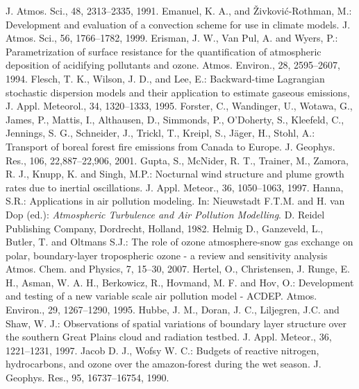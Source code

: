 \documentclass{egu}            %
\begin{document}
\begin{thebibliography}{}
J. Atmos. Sci., 48, 2313--2335, 1991.
Emanuel, K. A., and \v{Z}ivkovi\'{c}-Rothman, M.:
Development and evaluation of a convection scheme for use in climate models.
J. Atmos. Sci., 56, 1766--1782, 1999.
Erisman, J. W., Van Pul, A. and Wyers, P.:
Parametrization of surface resistance for the quantification of atmospheric deposition of acidifying pollutants and ozone.
Atmos. Environ., 28, 2595--2607, 1994.
Flesch, T. K., Wilson, J. D., and Lee, E.:
Backward-time Lagrangian stochastic dispersion models and their application to estimate gaseous emissions,
J. Appl. Meteorol., 34, 1320--1333, 1995.
Forster, C., Wandinger, U., Wotawa, G., James, P., Mattis, I., Althausen, D., Simmonds, P., O'Doherty, S., Kleefeld, C., Jennings, S. G., Schneider, J., Trickl, T., Kreipl, S., J\"ager, H., Stohl, A.:
Transport of boreal forest fire emissions from Canada to Europe.
J. Geophys. Res., 106, 22,887--22,906, 2001.
Gupta, S., McNider, R. T., Trainer, M., Zamora, R. J., Knupp, K. and Singh, M.P.:
Nocturnal wind structure and plume growth rates due to inertial oscillations.
J. Appl. Meteor., 36, 1050--1063, 1997.
Hanna, S.R.:
Applications in air pollution modeling. In: Nieuwstadt F.T.M. and H. van Dop (ed.): {\em Atmospheric Turbulence and Air Pollution Modelling}.
D. Reidel Publishing Company, Dordrecht, Holland, 1982.
Helmig D., Ganzeveld, L., Butler, T. and Oltmans S.J.: 
The role of ozone atmosphere-snow gas exchange on polar, boundary-layer tropospheric ozone - a review and sensitivity analysis 
Atmos. Chem. and Physics, 7, 15--30, 2007.
Hertel, O., Christensen, J. Runge, E. H., Asman, W. A. H., Berkowicz, R., Hovmand, M. F. and Hov, O.:
Development and testing of a new variable scale air pollution model - ACDEP.
Atmos. Environ., 29, 1267--1290, 1995.
Hubbe, J. M., Doran, J. C., Liljegren, J.C. and Shaw, W. J.:
Observations of spatial variations of boundary layer structure over the southern Great Plains cloud and radiation testbed.
J. Appl. Meteor., 36, 1221--1231, 1997.
Jacob D. J., Wofsy W. C.:
Budgets of reactive nitrogen, hydrocarbons, and ozone over the amazon-forest during the wet season. 
J. Geophys. Res., 95, 16737--16754, 1990. 

\end{thebibliography}
\end{document}

